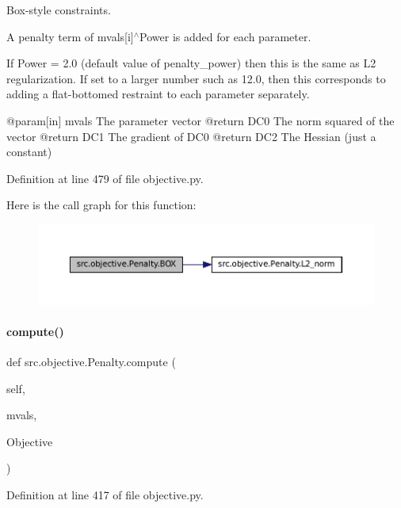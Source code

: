 Box-\/style constraints. 

A penalty term of mvals\mbox{[}i\mbox{]}$^\wedge$\+Power is added for each parameter. \begin{DoxyVerb}   If Power = 2.0 (default value of penalty_power) then this is the same as L2 regularization.
   If set to a larger number such as 12.0, then this corresponds to adding a flat-bottomed
   restraint to each parameter separately.

   @param[in] mvals The parameter vector
   @return DC0 The norm squared of the vector
   @return DC1 The gradient of DC0
   @return DC2 The Hessian (just a constant)\end{DoxyVerb}
 

Definition at line 479 of file objective.\+py.

Here is the call graph for this function\+:
\nopagebreak
\begin{figure}[H]
\begin{center}
\leavevmode
\includegraphics[width=350pt]{classsrc_1_1objective_1_1Penalty_a673bdca43bc69b1275fe96e235d3dc0b_cgraph}
\end{center}
\end{figure}
\mbox{\label{classsrc_1_1objective_1_1Penalty_a234f3d0c04908c8fe275df0b4b09afd0}} 
\paragraph{\texorpdfstring{compute()}{compute()}}
{\footnotesize\ttfamily def src.\+objective.\+Penalty.\+compute (\begin{DoxyParamCaption}\item[{}]{self,  }\item[{}]{mvals,  }\item[{}]{Objective }\end{DoxyParamCaption})}



Definition at line 417 of file objective.\+py.

